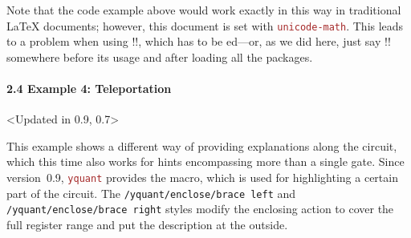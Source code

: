 \documentclass{scrartcl}
\makeatletter
\newenvironment{codeexample*}{%
   \VerbatimEnvironment%
   \let\FVB@VerbatimOut\minted@FVB@VerbatimOut
   \let\FVE@VerbatimOut\minted@FVE@VerbatimOut
   \minted@configlang{tex}%
   \minted@fvset
   \begin{VerbatimOut}[codes={\catcode`\^^I=12},firstline,lastline]{\minted@jobname.pyg}%
}{
   \end{VerbatimOut}%
   \minted@langlinenoson%
   \begin{adjustbox}{center}
       \minted@jobname.pyg %
   \end{adjustbox}\nopagebreak
   \expandafter\minted@pygmentize\expandafter{\minted@lang}%
   \minted@langlinenosoff%
   \par%
}
\def\pkg#1{\textcolor{brown}{\texttt{#1}}}
\def\ttlink{\link\texttt}
\def\texlink{\link\tex}
\def\Yquant{\pkg{yquant}}
\makeatother
\begin{document}
\begin{example}
                  Note that the code example above would work exactly in this way in traditional \LaTeX{} documents; however, this document is set with \pkg{unicode-math}.
                  This leads to a problem when using \tex!\bmod!, which has to be \texlink\protect ed---or, as we did here, just say \tex!\robustify\bmod! somewhere before its usage and after loading all the packages.
               \end{example}
            \endgroup

            \paragraph{2.4 Example 4: Teleportation}
               \begin{example}<Updated in 0.9, 0.7>
                  \begin{codeexample*}
                  \end{codeexample*}
                  This example shows a different way of providing explanations along the circuit, which this time also works for hints encompassing more than a single gate.
                  Since version~0.9, \Yquant{} provides the \texlink{\encloseall} macro, which is used for highlighting a certain part of the circuit.
                  The \ttlink{/yquant/enclose/brace left} and \ttlink{/yquant/enclose/brace right} styles modify the enclosing action to cover the full register range and put the description at the outside.
               \end{example}
\end{document}
